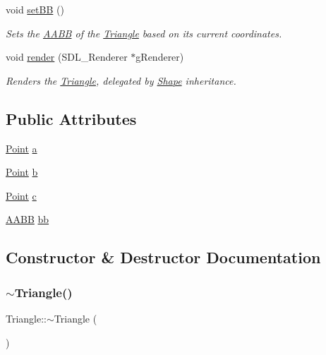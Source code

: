 \begin{DoxyCompactItemize}
void \mbox{\hyperlink{class_triangle_a857d761fa1f0b53b355d46be53a4796e}{set\+BB}} ()
\begin{DoxyCompactList}\small\item\em Sets the \mbox{\hyperlink{class_a_a_b_b}{A\+A\+BB}} of the \mbox{\hyperlink{class_triangle}{Triangle}} based on its current coordinates. \end{DoxyCompactList}\item 
void \mbox{\hyperlink{class_triangle_a46ec1698397a34b08cd788e305dda75c}{render}} (S\+D\+L\+\_\+\+Renderer $\ast$g\+Renderer)
\begin{DoxyCompactList}\small\item\em Renders the \mbox{\hyperlink{class_triangle}{Triangle}}, delegated by \mbox{\hyperlink{class_shape}{Shape}} inheritance. \end{DoxyCompactList}\end{DoxyCompactItemize}
\subsection*{Public Attributes}
\begin{DoxyCompactItemize}
\item 
\mbox{\hyperlink{class_point}{Point}} \mbox{\hyperlink{class_triangle_a08d2940a819cebd3321beeebbaef389e}{a}}
\item 
\mbox{\hyperlink{class_point}{Point}} \mbox{\hyperlink{class_triangle_af4167c2fce79260b261531d0b0fd3798}{b}}
\item 
\mbox{\hyperlink{class_point}{Point}} \mbox{\hyperlink{class_triangle_a972f16cb46805d72e9421b3c42ebc980}{c}}
\item 
\mbox{\hyperlink{class_a_a_b_b}{A\+A\+BB}} \mbox{\hyperlink{class_triangle_a71ce28afaa44e5b6c94a5150db358879}{bb}}
\end{DoxyCompactItemize}


\subsection{Constructor \& Destructor Documentation}
\mbox{\label{class_triangle_a5199760a17454f4dc94c855a57e3a152}} 
\subsubsection{\texorpdfstring{$\sim$Triangle()}{~Triangle()}}
{\footnotesize\ttfamily Triangle\+::$\sim$\+Triangle (\begin{DoxyParamCaption}{ }\end{DoxyParamCaption})}



